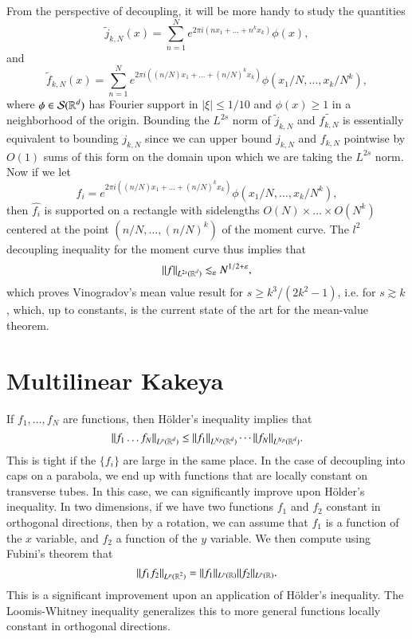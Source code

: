 From the perspective of decoupling, it will be more handy to study the quantities
%
\[ \tilde{j}_{k,N}(x) = \sum_{n = 1}^N e^{2 \pi i (n x_1 + \dots + n^k x_k)} \phi(x), \]
%
and
%
\[ \tilde{f}_{k,N}(x) = \sum_{n = 1}^N e^{2 \pi i ((n/N) x_1 + \dots + (n/N)^k x_k)} \phi(x_1 / N, \dots, x_k / N^k), \]
%
where $\phi \in \mathcal{S}(\operatorname{\mathbb{R}}^d)$ has Fourier support in $|\xi| \leq 1/10$ and $\phi(x) \geq 1$ in a neighborhood of the origin. Bounding the $L^{2s}$ norm of $\tilde{j}_{k,N}$ and $\tilde{f_{k,N}}$ is essentially equivalent to bounding $j_{k,N}$ since we can upper bound $j_{k,N}$ and $f_{k,N}$ pointwise by $O(1)$ sums of this form on the domain upon which we are taking the $L^{2s}$ norm. Now if we let
%
\[ f_i = e^{2 \pi i ((n/N) x_1 + \dots + (n/N)^k x_k)} \phi(x_1 / N, \dots, x_k / N^k), \]
%
then $\widehat{f_i}$ is supported on a rectangle with sidelengths $O(N) \times \dots \times O(N^k)$ centered at the point $(n/N, \dots, (n/N)^k)$ of the moment curve. The $l^2$ decoupling inequality for the moment curve thus implies that
%
\[ \| f \|_{L^{2s}(\operatorname{\mathbb{R}}^d)} \lesssim_\varepsilon N^{1/2 + \varepsilon}, \]
%
which proves Vinogradov's mean value result for $s \geq k^3 / (2k^2 - 1)$, i.e. for $s \gtrsim k$, which, up to constants, is the current state of the art for the mean-value theorem.










\section{Multilinear Kakeya}

If $f_1,\dots, f_N$ are functions, then H\"{o}lder's inequality implies that
%
\[ \| f_1 \dots f_N \|_{L^p(\operatorname{\mathbb{R}}^d)} \leq \| f_1 \|_{L^{Np}(\operatorname{\mathbb{R}}^d)} \cdots \| f_N \|_{L^{Np}(\operatorname{\mathbb{R}}^d)}. \]
%
This is tight if the $\{ f_i \}$ are large in the same place. In the case of decoupling into caps on a parabola, we end up with functions that are locally constant on transverse tubes. In this case, we can significantly improve upon H\"{o}lder's inequality. In two dimensions, if we have two functions $f_1$ and $f_2$ constant in orthogonal directions, then by a rotation, we can assume that $f_1$ is a function of the $x$ variable, and $f_2$ a function of the $y$ variable. We then compute using Fubini's theorem that
%
\[ \| f_1 f_2 \|_{L^p(\operatorname{\mathbb{R}}^2)} = \| f_1 \|_{L^p(\operatorname{\mathbb{R}})} \| f_2 \|_{L^p(\operatorname{\mathbb{R}})}. \]
%
This is a significant improvement upon an application of H\"{o}lder's inequality. The Loomis-Whitney inequality generalizes this to more general functions locally constant in orthogonal directions.

